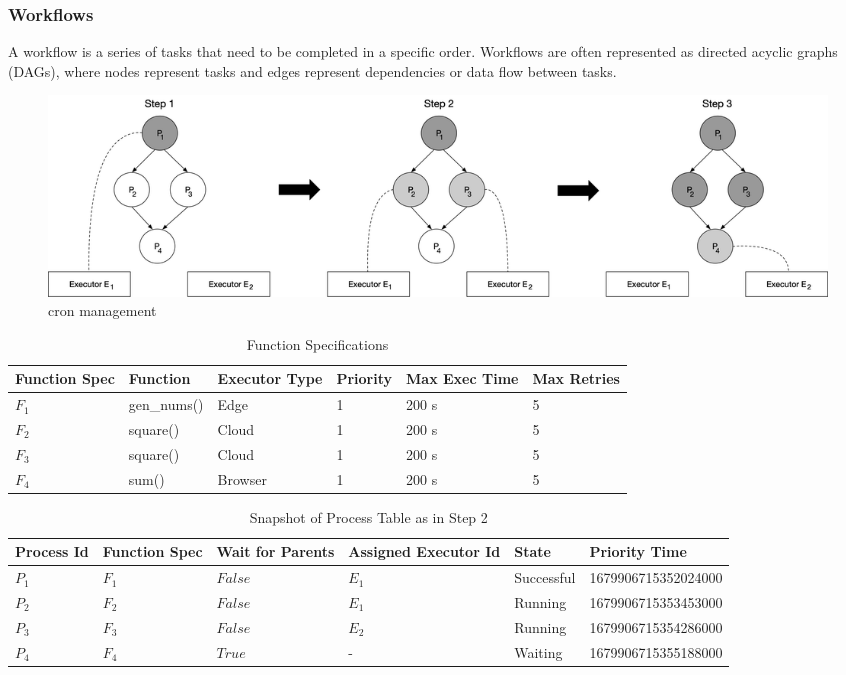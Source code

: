 \documentclass{article}
\begin{document}
\subsubsection{Workflows}
A workflow is a series of tasks that need to be completed in a specific order. Workflows are often represented as directed acyclic graphs (DAGs), where nodes represent tasks and edges represent dependencies or data flow between tasks. 

\begin{figure}[h]
	\centering
    \includegraphics[scale=0.30]{workflow.png}
	\caption{cron management}
	\label{fig:fig3}
\end{figure}

\begin{table}[h]
	\caption{Function Specifications}
	\centering
	\begin{tabular}{llllll}
		\toprule
		\cmidrule(r){1-2}
        Function Spec & Function        & Executor Type & Priority & Max Exec Time & Max Retries \\
		\midrule
        $F_{1}$       & gen\_nums()     & Edge          & 1        & 200 s         & 5 \\
        $F_{2}$       & square()        & Cloud         & 1        & 200 s         & 5 \\
        $F_{3}$       & square()        & Cloud         & 1        & 200 s         & 5 \\
        $F_{4}$       & sum()           & Browser       & 1        & 200 s         & 5 \\
		\bottomrule
	\end{tabular}
	\label{tab:table}
\end{table}

\begin{table}[h]
	\caption{Snapshot of Process Table as in Step 2}
	\centering
	\begin{tabular}{llllll}
		\toprule
		\cmidrule(r){1-2}
        Process Id & Function Spec & Wait for Parents & Assigned Executor Id & State      & Priority Time \\
		\midrule
        $P_{1}$    & $F_{1}$       & $False$          & $E_{1}$              & Successful & 1679906715352024000 \\
        $P_{2}$    & $F_{2}$       & $False$          & $E_{1}$              & Running    & 1679906715353453000 \\
        $P_{3}$    & $F_{3}$       & $False$          & $E_{2}$              & Running    & 1679906715354286000 \\
        $P_{4}$    & $F_{4}$       & $True$           & -                    & Waiting    & 1679906715355188000 \\
		\bottomrule
	\end{tabular}
	\label{tab:table}
\end{table}
\end{document}
